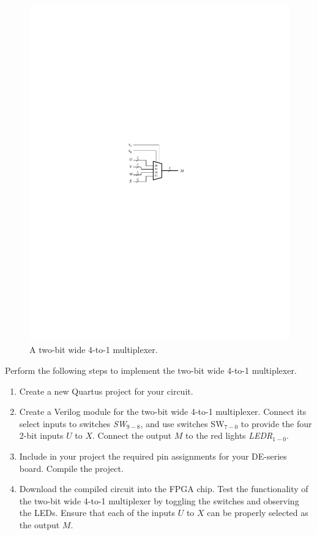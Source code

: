 \documentclass[epsfig,10pt,fullpage]{article}
\begin{document}
\begin{figure}[H]
	\begin{center}
		\includegraphics[]{figures/figure5.pdf}
	\end{center}
\caption{A two-bit wide 4-to-1 multiplexer.}
\label{fig:5}
\end{figure}

Perform the following steps to implement the two-bit wide 4-to-1 multiplexer.
\begin{enumerate}
\item Create a new Quartus project for your circuit.
\item Create a Verilog module for the two-bit wide 4-to-1 multiplexer. Connect its select
inputs to switches {\it SW}$_{9-8}$, and use switches SW$_{7-0}$ to
provide the four 2-bit inputs $U$ to $X$. Connect the 
output $M$ to the red lights {\it LEDR}$_{1-0}$.
\item Include in your project the required pin assignments for your DE-series board.
Compile the project.
\item Download the compiled circuit into the FPGA chip. Test the functionality of the 
two-bit wide 4-to-1 multiplexer by toggling the switches and observing the LEDs. Ensure
that each of the inputs $U$ to $X$ can be properly selected as the output $M$.
\end{enumerate}
\end{document}

